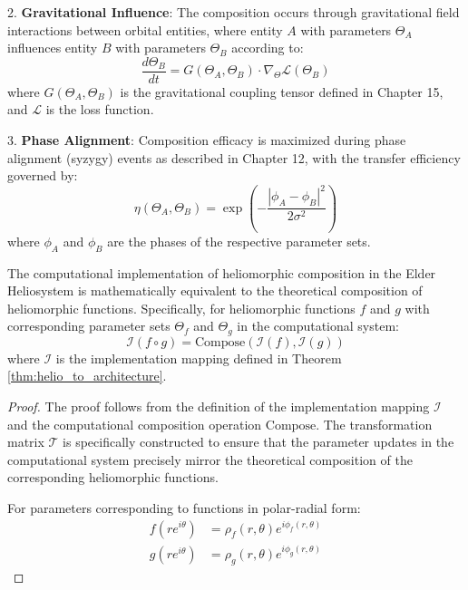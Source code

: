 \begin{definition}
\begin{enumerate}
\begin{definition}
2. \textbf{Gravitational Influence}: The composition occurs through gravitational field interactions between orbital entities, where entity $A$ with parameters $\Theta_A$ influences entity $B$ with parameters $\Theta_B$ according to:
\begin{equation}
\frac{d\Theta_B}{dt} = G(\Theta_A, \Theta_B) \cdot \nabla_{\Theta} \mathcal{L}(\Theta_B)
\end{equation}
where $G(\Theta_A, \Theta_B)$ is the gravitational coupling tensor defined in Chapter 15, and $\mathcal{L}$ is the loss function.

3. \textbf{Phase Alignment}: Composition efficacy is maximized during phase alignment (syzygy) events as described in Chapter 12, with the transfer efficiency governed by:
\begin{equation}
\eta(\Theta_A, \Theta_B) = \exp\left(-\frac{|\phi_A - \phi_B|^2}{2\sigma^2}\right)
\end{equation}
where $\phi_A$ and $\phi_B$ are the phases of the respective parameter sets.
\end{definition}

\begin{theorem}
\label{thm:composition_equivalence}
The computational implementation of heliomorphic composition in the Elder Heliosystem is mathematically equivalent to the theoretical composition of heliomorphic functions. Specifically, for heliomorphic functions $f$ and $g$ with corresponding parameter sets $\Theta_f$ and $\Theta_g$ in the computational system:
\begin{equation}
\mathcal{I}(f \circ g) = \text{Compose}(\mathcal{I}(f), \mathcal{I}(g))
\end{equation}
where $\mathcal{I}$ is the implementation mapping defined in Theorem \ref{thm:helio_to_architecture}.
\end{theorem}

\begin{proof}
The proof follows from the definition of the implementation mapping $\mathcal{I}$ and the computational composition operation $\text{Compose}$. The transformation matrix $\mathcal{T}$ is specifically constructed to ensure that the parameter updates in the computational system precisely mirror the theoretical composition of the corresponding heliomorphic functions.

For parameters corresponding to functions in polar-radial form:
\begin{align}
f(re^{i\theta}) &= \rho_f(r,\theta)e^{i\phi_f(r,\theta)}\\
g(re^{i\theta}) &= \rho_g(r,\theta)e^{i\phi_g(r,\theta)}
\end{align}


\end{proof}
\end{enumerate}
\end{definition}
